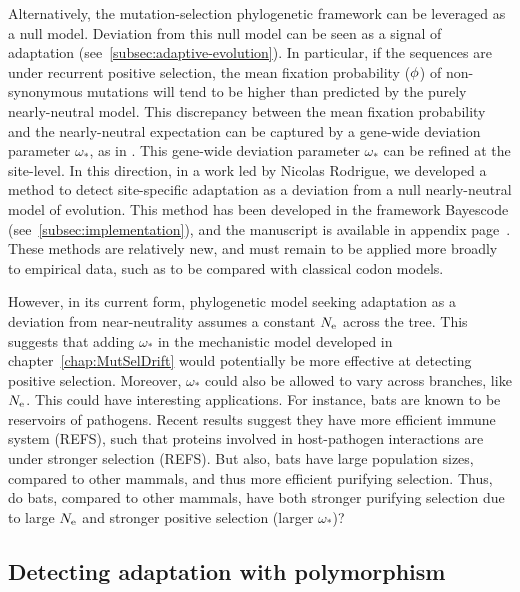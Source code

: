 Alternatively, the mutation-selection phylogenetic framework can be leveraged as a null model.
Deviation from this null model can be seen as a signal of adaptation (see~\ref{subsec:adaptive-evolution}).
In particular, if the sequences are under recurrent positive selection, the mean fixation probability ($\phi$) of non-synonymous mutations will tend to be higher than predicted by the purely nearly-neutral model.
This discrepancy between the mean fixation probability and the nearly-neutral expectation can be captured by a gene-wide deviation parameter $\omega_*$, as in \citet{Rodrigue2016}.
This gene-wide deviation parameter $\omega_*$ can be refined at the site-level.
In this direction, in a work led by Nicolas Rodrigue, we developed a method to detect site-specific adaptation as a deviation from a null nearly-neutral model of evolution.
This method has been developed in the framework Bayescode (see~\ref{subsec:implementation}), and the manuscript is available in appendix page~\pageref{sec-appendix:MutSelM3starMBE}.
These methods are relatively new, and must remain to be applied more broadly to empirical data, such as to be compared with classical codon models.

However, in its current form, phylogenetic model seeking adaptation as a deviation from near-neutrality assumes a constant $N_{\textrm{e}}$ across the tree.
This suggests that adding $\omega_*$ in the mechanistic model developed in chapter~\ref{chap:MutSelDrift} would potentially be more effective at detecting positive selection.
Moreover, $\omega_*$ could also be allowed to vary across branches, like $N_{\textrm{e}}$.
This could have interesting applications.
For instance, bats are known to be reservoirs of pathogens.
Recent results suggest they have more efficient immune system (REFS), such that proteins involved in host-pathogen interactions are under stronger selection (REFS).
But also, bats have large population sizes, compared to other mammals, and thus more efficient purifying selection.
Thus, do bats, compared to other mammals, have both stronger purifying selection due to large $N_{\textrm{e}}$ and stronger positive selection (larger $\omega_*$)?

\subsection{Detecting adaptation with polymorphism}
\label{subsec:detecting-adaptation-with-polymorphism}

